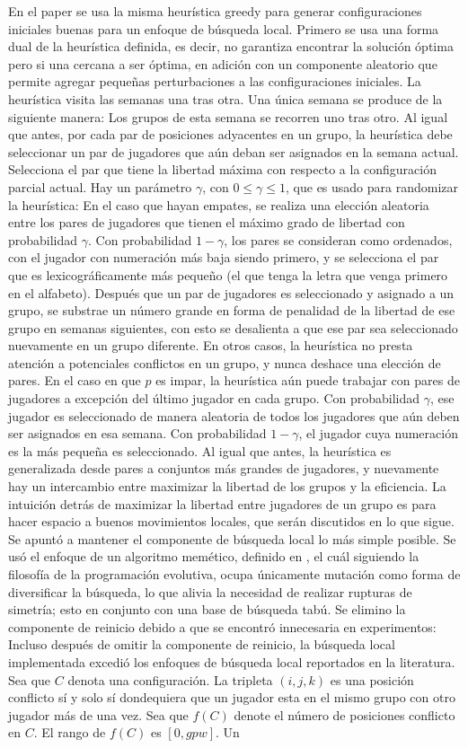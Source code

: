 \documentclass[letter, 10pt]{article}
\begin{document}
En el paper se usa la misma heurística greedy para generar configuraciones iniciales buenas para un enfoque de búsqueda local. Primero se usa una forma dual de la heurística definida, es decir, no garantiza encontrar la solución óptima pero si una cercana a ser óptima, en adición con un componente aleatorio que permite agregar pequeñas perturbaciones a las configuraciones iniciales. La heurística visita las semanas una tras otra. Una única semana se produce de la siguiente manera: Los grupos de esta semana se recorren uno tras otro. Al igual que antes, por cada par de posiciones adyacentes en un grupo, la heurística debe seleccionar un par de jugadores que aún deban ser asignados en la semana actual. Selecciona el par que tiene la libertad máxima con respecto a la configuración parcial actual. Hay un parámetro $\gamma$, con $0 \leq \gamma \leq 1$, que es usado para randomizar la heurística: En el caso que hayan empates, se realiza una elección aleatoria entre los pares de jugadores que tienen el máximo grado de libertad con probabilidad $\gamma$. Con probabilidad $1-\gamma$, los pares se consideran como ordenados, con el jugador con numeración más baja siendo primero, y se selecciona el par que es lexicográficamente más pequeño (el que tenga la letra que venga primero en el alfabeto). Después que un par de jugadores es seleccionado y asignado a un grupo, se substrae un número grande en forma de penalidad de la libertad de ese grupo en semanas siguientes, con esto se desalienta a que ese par sea seleccionado nuevamente en un grupo diferente. En otros casos, la heurística no presta atención a potenciales conflictos en un grupo, y nunca deshace una elección de pares. En el caso en que $p$ es impar, la heurística aún puede trabajar con pares de jugadores a excepción del último jugador en cada grupo. Con probabilidad $\gamma$, ese jugador es seleccionado de manera aleatoria de todos los jugadores que aún deben ser asignados en esa semana. Con probabilidad $1-\gamma$, el jugador cuya numeración es la más pequeña es seleccionado. Al igual que antes, la heurística es generalizada desde pares a conjuntos más grandes de jugadores, y nuevamente hay un intercambio entre maximizar la libertad de los grupos y la eficiencia. La intuición detrás de maximizar la libertad entre jugadores de un grupo es para hacer espacio a buenos movimientos locales, que serán discutidos en lo que sigue. Se apuntó a mantener el componente de búsqueda local lo más simple posible. Se usó el enfoque de un algoritmo memético, definido en \cite{cotta2006ma}, el cuál siguiendo la filosofía de la programación evolutiva, ocupa únicamente mutación como forma de diversificar la búsqueda, lo que alivia la necesidad de realizar rupturas de simetría; esto en conjunto con una base de búsqueda tabú. Se elimino la componente de reinicio debido a que se encontró innecesaria en experimentos: Incluso después de omitir la componente de reinicio, la búsqueda local implementada excedió los enfoques de búsqueda local reportados en la literatura. Sea que $C$ denota una configuración. La tripleta $(i,j,k)$ es una posición conflicto sí y solo sí dondequiera que un jugador esta en el mismo grupo con otro jugador más de una vez. Sea que $f(C)$ denote el número de posiciones conflicto en $C$. El rango de $f(C)$ es $[0,gpw]$. Un 
\end{document}
